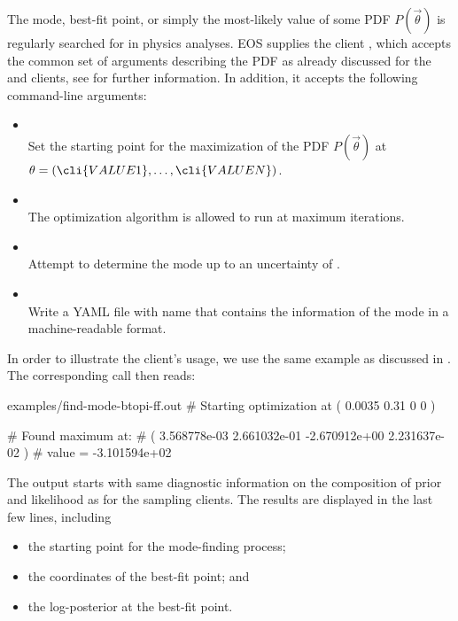 The mode, best-fit point, or simply the most-likely value of some \gls{PDF}
$P(\vec\theta)$ is regularly searched for in physics analyses. EOS supplies the
client , which accepts the common set of arguments
describing the PDF as already discussed for the  and
 clients, see  for
further information.  In addition, it accepts the following command-line
arguments:
\begin{itemize}
    \item[] \\[\medskipamount]
        Set the starting point for the maximization of the PDF $P(\vec\theta)$
        at $\theta = ( \cli{VALUE1}, \dots, \cli{VALUEN} )$.
    \item[] \\[\medskipamount]
        The optimization algorithm is allowed to run at maximum  iterations.
    \item[] \\[\medskipamount]
        Attempt to determine the mode up to an uncertainty of .
    \item[] \\[\medskipamount]
        Write a YAML file with name  that contains the information of
        the mode in a machine-readable format.
\end{itemize}

In order to illustrate the client's usage, we use the same example as
discussed in . The corresponding call
then reads:

\begin{filecontents*}{examples/find-mode-btopi-ff.out}
# Starting optimization at ( 0.0035 0.31 0 0 )

# Found maximum at: 
#   ( 3.568778e-03 2.661032e-01 -2.670912e+00 2.231637e-02 )
#   value = -3.101594e+02
\end{filecontents*}
The output starts with same diagnostic information on the composition of
prior and likelihood as for the sampling clients. The results are displayed
in the last few lines, including
\begin{itemize}
    \item the starting point for the mode-finding process;
    \item the coordinates of the best-fit point; and
    \item the log-posterior at the best-fit point.
\end{itemize}

